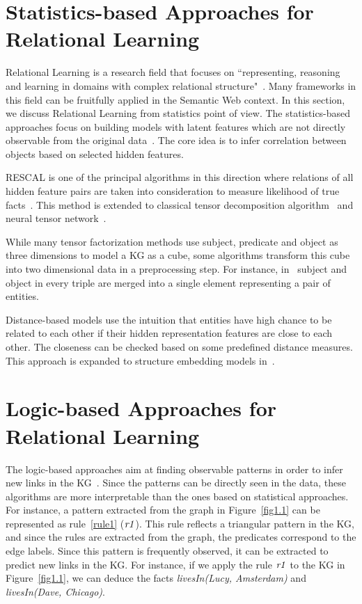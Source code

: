 \section{Statistics-based Approaches for Relational Learning}

Relational Learning is a research field that focuses on ``representing, reasoning and learning in domains with complex relational structure"~\cite{ref43}. Many frameworks in this field can be fruitfully applied in the Semantic Web context. In this section, we discuss Relational Learning from statistics point of view. The statistics-based approaches focus on building models with latent features which are not directly observable from the original data~\cite{ref1}. The core idea is to infer correlation between objects based on selected hidden features.

RESCAL is one of the principal algorithms in this direction where relations of all hidden feature pairs are taken into consideration to measure likelihood of true facts~\cite{ref2, ref3}. This method is extended to classical tensor decomposition algorithm~\cite{ref4} and neural tensor network~\cite{ref5}.

While many tensor factorization methods use subject, predicate and object as three dimensions to model a KG as a cube, some algorithms transform this cube into two dimensional data in a preprocessing step. For instance, in~\cite{ref6, ref7} subject and object in every triple are merged into a single element representing a pair of entities.%

Distance-based models use the intuition that entities have high chance to be related to each other if their hidden representation features are close to each other. The closeness can be checked based on some predefined distance measures. This approach is expanded to structure embedding models in~\cite{ref8}.

\section{Logic-based Approaches for Relational Learning}

The logic-based approaches aim at finding observable patterns in order to infer new links in the KG~\cite{ref1}. Since the patterns can be directly seen in the data, these algorithms are more interpretable than the ones based on statistical approaches. For instance, a pattern extracted from the graph in Figure~\ref{fig1.1} can be represented as rule~\ref{rule1} ($\mathit{r1}$). This rule reflects a triangular pattern in the KG, and since the rules are extracted from the graph, the predicates correspond to the edge labels. Since this pattern is frequently observed, it can be extracted to predict new links in the KG. For instance, if we apply the rule $\mathit{r1}$ to the KG in Figure~\ref{fig1.1}, we can deduce the facts \textit{livesIn(Lucy, Amsterdam)} and \textit{livesIn(Dave, Chicago)}.

